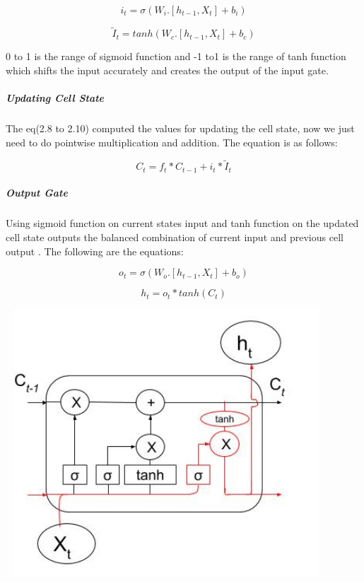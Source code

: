 \begin{equation}
	i_{t} = \sigma (W_{i} . [h_{t-1}, X_{t}] + b_{i})
\end{equation}

\begin{equation}
	\tilde{I}_{t} = tanh (W_{c} . [h_{t-1}, X_{t}] + b_{c})	
\end{equation}

0 to 1 is the range of sigmoid function and -1 to1 is the range of tanh function which shifts the input accurately and creates the output of the input gate.


\subparagraph{Updating Cell State}

The eq(2.8 to 2.10) computed the values for updating the cell state, now we just need to do pointwise multiplication and addition. The equation is as follows:

\begin{equation}
		C_{t} = f_{t} * C_{t-1} + i_{t} * \tilde{I}_{t}
\end{equation}


\subparagraph{Output Gate}

Using sigmoid function on current states input and tanh function on the updated cell state outputs the balanced combination of current input and previous cell output . The following are the equations:

\begin{equation}
	o_{t} = \sigma (W_{o} . [h_{t-1}, X_{t}] + b_{o})
\end{equation}

\begin{equation}
	h_{t}  = o_{t} * tanh( C_{t} )
\end{equation}

				\begin{center}
				\includegraphics[width=12cm,height=10cm]{figures/output-gate.jpg}	
				\label{fig: Output Gate}
				\end{center}


